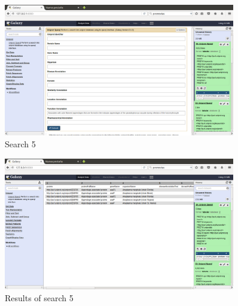 \documentclass[12pt]{article}
\begin{document}
\begin{figure}[h]
	\includegraphics[width=0.9\textwidth]{figures/5a}
	\caption{Search 5}
	\label{fig:example_5a}
\end{figure}
\begin{figure}[h]
	\includegraphics[width=0.9\textwidth]{figures/5b}
	\caption{Results of search 5}
	\label{fig:example_5b}
\end{figure}

\clearpage
\end{document}
